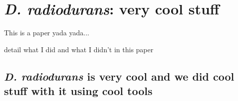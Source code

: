 \chapter{\textit{D. radiodurans}: very cool stuff}

This is a paper yada yada...

\begin{outline}
\1 detail what I did and what I didn't in this paper
\end{outline}

\section*{\textit{D. radiodurans} is very cool and we did cool stuff with it using cool tools}

\localtableofcontents
